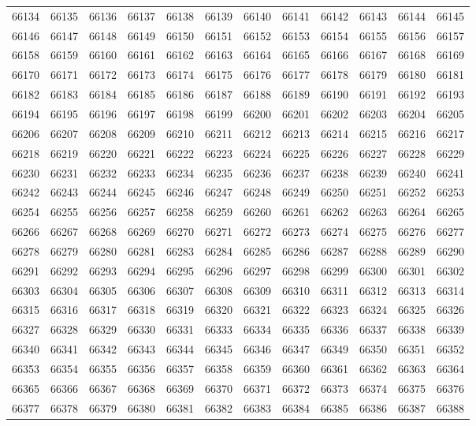 \begin{center}
\begin{longtable}{llllllllllll}
66134 &66135 &66136 &66137 &66138 &66139 &66140 &66141 &66142 &66143 &66144 &66145 \\
66146 &66147 &66148 &66149 &66150 &66151 &66152 &66153 &66154 &66155 &66156 &66157 \\
66158 &66159 &66160 &66161 &66162 &66163 &66164 &66165 &66166 &66167 &66168 &66169 \\
66170 &66171 &66172 &66173 &66174 &66175 &66176 &66177 &66178 &66179 &66180 &66181 \\
66182 &66183 &66184 &66185 &66186 &66187 &66188 &66189 &66190 &66191 &66192 &66193 \\
66194 &66195 &66196 &66197 &66198 &66199 &66200 &66201 &66202 &66203 &66204 &66205 \\
66206 &66207 &66208 &66209 &66210 &66211 &66212 &66213 &66214 &66215 &66216 &66217 \\
66218 &66219 &66220 &66221 &66222 &66223 &66224 &66225 &66226 &66227 &66228 &66229 \\
66230 &66231 &66232 &66233 &66234 &66235 &66236 &66237 &66238 &66239 &66240 &66241 \\
66242 &66243 &66244 &66245 &66246 &66247 &66248 &66249 &66250 &66251 &66252 &66253 \\
66254 &66255 &66256 &66257 &66258 &66259 &66260 &66261 &66262 &66263 &66264 &66265 \\
66266 &66267 &66268 &66269 &66270 &66271 &66272 &66273 &66274 &66275 &66276 &66277 \\
66278 &66279 &66280 &66281 &66283 &66284 &66285 &66286 &66287 &66288 &66289 &66290 \\
66291 &66292 &66293 &66294 &66295 &66296 &66297 &66298 &66299 &66300 &66301 &66302 \\
66303 &66304 &66305 &66306 &66307 &66308 &66309 &66310 &66311 &66312 &66313 &66314 \\
66315 &66316 &66317 &66318 &66319 &66320 &66321 &66322 &66323 &66324 &66325 &66326 \\
66327 &66328 &66329 &66330 &66331 &66333 &66334 &66335 &66336 &66337 &66338 &66339 \\
66340 &66341 &66342 &66343 &66344 &66345 &66346 &66347 &66349 &66350 &66351 &66352 \\
66353 &66354 &66355 &66356 &66357 &66358 &66359 &66360 &66361 &66362 &66363 &66364 \\
66365 &66366 &66367 &66368 &66369 &66370 &66371 &66372 &66373 &66374 &66375 &66376 \\
66377 &66378 &66379 &66380 &66381 &66382 &66383 &66384 &66385 &66386 &66387 &66388 \\

\end{longtable}
\end{center}
